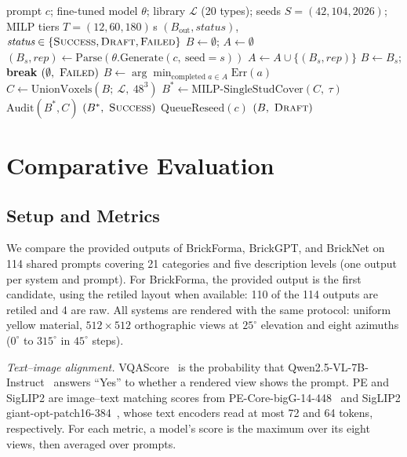 \documentclass[letterpaper]{article} %
\begin{document}
\begin{algorithm}[t]
\caption{BrickForma inference and retiling}
\label{alg:inference-retiling}
\small
\begin{algorithmic}[1]
\REQUIRE prompt $c$; fine-tuned model $\theta$; library $\mathcal{L}$ (20 types); seeds $S=(42,104,2026)$; MILP tiers $T=(12,60,180)$\,s
\ENSURE $(B_{\mathrm{out}}, \textit{status})$, $\textit{status}\in\{\textsc{Success},\textsc{Draft},\textsc{Failed}\}$
\STATE $B \gets \emptyset$; $A \gets \emptyset$
  \STATE $(B_s,\textit{rep}) \gets \mathrm{Parse}(\theta.\mathrm{Generate}(c,\ \mathrm{seed}{=}s))$
  \STATE $A \gets A \cup \{(B_s,\textit{rep})\}$
    \STATE $B \gets B_s$; \textbf{break}
  \ENDIF
\ENDFOR
{}
    \RETURN $(\emptyset,\ \textsc{Failed})$
  \ENDIF
  \STATE $B \gets \arg\min_{\text{completed } a\in A} \mathrm{Err}(a)$
\ENDIF
\STATE $C \gets \mathrm{UnionVoxels}(B;\ \mathcal{L},\ 48^3)$ 
  \STATE $B^{*} \gets \mathrm{MILP\text{-}SingleStudCover}(C,\ \tau)$
    \STATE $\mathrm{Audit}(B^{*},C)$ 
    \RETURN $(B^{*},\ \textsc{Success})$
  \ENDIF
\ENDFOR
\STATE $\mathrm{QueueReseed}(c)$
\RETURN $(B,\ \textsc{Draft})$ 
\end{algorithmic}
\end{algorithm}

\section{Comparative Evaluation}
\label{sec:eval}
\subsection{Setup and Metrics}
We compare the provided outputs of BrickForma, BrickGPT, and BrickNet on 114 shared prompts covering 21 categories and five description levels (one output per system and prompt). For BrickForma, the provided output is the first candidate, using the retiled layout when available: 110 of the 114 outputs are retiled and 4 are raw. All systems are rendered with the same protocol: uniform yellow material, $512{\times}512$ orthographic views at $25^{\circ}$ elevation and eight azimuths ($0^{\circ}$ to $315^{\circ}$ in $45^{\circ}$ steps).

\emph{Text--image alignment.} VQAScore~\cite{vqascore} is the probability that Qwen2.5-VL-7B-Instruct~\cite{qwen25vl} answers ``Yes'' to whether a rendered view shows the prompt. PE and SigLIP2 are image--text matching scores from PE-Core-bigG-14-448~\cite{pe} and SigLIP2 giant-opt-patch16-384~\cite{siglip2}, whose text encoders read at most 72 and 64 tokens, respectively. For each metric, a model's score is the maximum over its eight views, then averaged over prompts.
\end{document}

